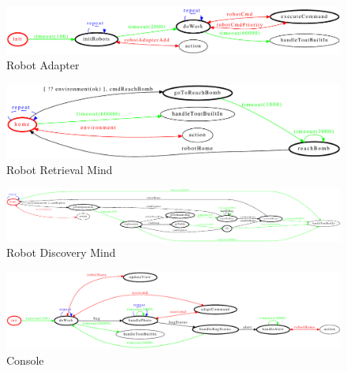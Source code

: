 \begin{figure}[H]
  \centering
  \includegraphics[width=\textwidth]{res/sprint1/problem/robot_adapter}
  \caption{Robot Adapter}%
  \label{fig:sp1:prob:robotadapter}
\end{figure}

\begin{figure}[H]
  \centering
  \includegraphics[width=\textwidth]{res/sprint1/problem/robot_retriever_mind}
  \caption{Robot Retrieval Mind}%
  \label{fig:sp1:prob:robotretrieval}
\end{figure}

\begin{figure}[H]
  \centering
  \includegraphics[width=\textwidth]{res/sprint1/problem/robot_discovery_mind}
  \caption{Robot Discovery Mind}%
  \label{fig:sp1:prob:robotdiscovery}
\end{figure}

\begin{figure}[H]
  \centering
  \includegraphics[width=\textwidth]{res/sprint1/problem/console}
  \caption{Console}%
  \label{fig:sp1:prob:console}
\end{figure}

